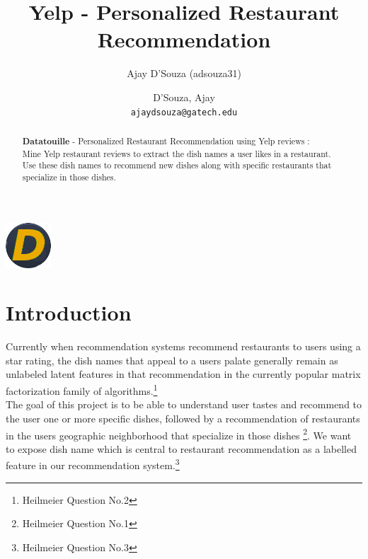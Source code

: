 \documentclass[twoside,12pt]{article}
\title{Yelp - Personalized Restaurant Recommendation}
\author{Ajay D'Souza (adsouza31)}
\author{
  D'Souza, Ajay\\
  \texttt{ajaydsouza@gatech.edu}
}
\date{}
\begin{document}
\maketitle
\begin{center}
\includegraphics{logo.png}
\end{center}

\begin{abstract}
\textbf{Datatouille} - Personalized Restaurant Recommendation using Yelp reviews : \\
Mine Yelp restaurant reviews to extract the dish names a user likes in a restaurant. Use these dish names to recommend new dishes along with specific restaurants that specialize in those dishes.
\end{abstract}
\pagebreak
\tableofcontents

\pagebreak
\listoffigures
\listoftables

\pagebreak



%
%
\section{Introduction}
\label{Introduction}
Currently when recommendation systems recommend restaurants to users using a star rating, the dish names that appeal to a users palate generally remain as unlabeled latent features in that recommendation in the currently popular matrix factorization family of algorithms.\footnote{Heilmeier Question No.2}\\

The goal of this project is to be able to understand user tastes and recommend to the user one or more specific dishes, followed by a recommendation of restaurants in the users geographic neighborhood that specialize in those dishes \footnote{Heilmeier Question No.1}. We want to expose dish name which is central to restaurant recommendation as a labelled feature in our recommendation system.\footnote{Heilmeier Question No.3}
\end{document}
